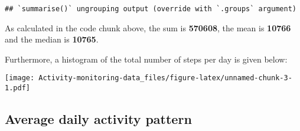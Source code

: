 \documentclass[]{article}
\newenvironment{Shaded}{\begin{snugshade}}{\end{snugshade}}
\newcommand{\KeywordTok}[1]{\textcolor[rgb]{0.13,0.29,0.53}{\textbf{#1}}}
\newcommand{\DataTypeTok}[1]{\textcolor[rgb]{0.13,0.29,0.53}{#1}}
\newcommand{\DecValTok}[1]{\textcolor[rgb]{0.00,0.00,0.81}{#1}}
\newcommand{\StringTok}[1]{\textcolor[rgb]{0.31,0.60,0.02}{#1}}
\newcommand{\OperatorTok}[1]{\textcolor[rgb]{0.81,0.36,0.00}{\textbf{#1}}}
\newcommand{\NormalTok}[1]{#1}
\begin{document}
\begin{verbatim}
## `summarise()` ungrouping output (override with `.groups` argument)
\end{verbatim}

\begin{Shaded}
\end{Shaded}

As calculated in the code chunk above, the sum is \textbf{570608}, the
mean is \textbf{10766} and the median is \textbf{10765}.

Furthermore, a histogram of the total number of steps per day is given
below:

\begin{Shaded}
\end{Shaded}

\texttt{[image: Activity-monitoring-data\_files/figure-latex/unnamed-chunk-3-1.pdf]}

\subsection{Average daily activity
pattern}\label{average-daily-activity-pattern}
\end{document}
